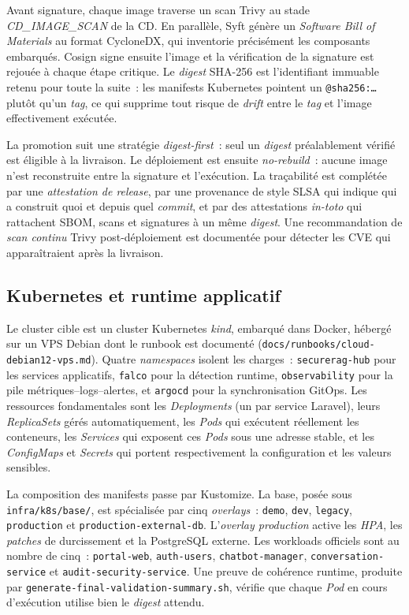 Avant signature, chaque image traverse un scan Trivy au stade
\emph{CD\_IMAGE\_SCAN} de la CD. En parallèle, Syft génère un
\emph{Software Bill of Materials} au format CycloneDX, qui inventorie
précisément les composants embarqués. Cosign signe ensuite l'image et la
vérification de la signature est rejouée à chaque étape critique. Le
\emph{digest} SHA-256 est l'identifiant immuable retenu pour toute la
suite~: les manifests Kubernetes pointent un \texttt{@sha256:\dots}
plutôt qu'un \emph{tag}, ce qui supprime tout risque de \emph{drift}
entre le \emph{tag} et l'image effectivement exécutée.

La promotion suit une stratégie \emph{digest-first}~: seul un \emph{digest}
préalablement vérifié est éligible à la livraison. Le déploiement est
ensuite \emph{no-rebuild}~: aucune image n'est reconstruite entre la
signature et l'exécution. La traçabilité est complétée par une
\emph{attestation de release}, par une provenance de style SLSA qui
indique qui a construit quoi et depuis quel \emph{commit}, et par des
attestations \emph{in-toto} qui rattachent SBOM, scans et signatures à un
même \emph{digest}. Une recommandation de \emph{scan continu} Trivy
post-déploiement est documentée pour détecter les CVE qui apparaîtraient
après la livraison.

\subsection{Kubernetes et runtime applicatif}
\label{subsec:concepts-k8s}

Le cluster cible est un cluster Kubernetes \emph{kind}, embarqué dans
Docker, hébergé sur un VPS Debian dont le runbook est documenté
(\texttt{docs/runbooks/cloud-debian12-vps.md}). Quatre \emph{namespaces}
isolent les charges~: \texttt{securerag-hub} pour les services
applicatifs, \texttt{falco} pour la détection runtime,
\texttt{observability} pour la pile métriques--logs--alertes, et
\texttt{argocd} pour la synchronisation GitOps. Les ressources
fondamentales sont les \emph{Deployments} (un par service Laravel),
leurs \emph{ReplicaSets} gérés automatiquement, les \emph{Pods} qui
exécutent réellement les conteneurs, les \emph{Services} qui exposent
ces \emph{Pods} sous une adresse stable, et les \emph{ConfigMaps} et
\emph{Secrets} qui portent respectivement la configuration et les
valeurs sensibles.

La composition des manifests passe par Kustomize. La base, posée sous
\texttt{infra/k8s/base/}, est spécialisée par cinq \emph{overlays}~:
\texttt{demo}, \texttt{dev}, \texttt{legacy}, \texttt{production} et
\texttt{production-external-db}. L'\emph{overlay production} active les
\emph{HPA}, les \emph{patches} de durcissement et la PostgreSQL externe.
Les workloads officiels sont au nombre de cinq~: \texttt{portal-web},
\texttt{auth-users}, \texttt{chatbot-manager},
\texttt{conversation-service} et \texttt{audit-security-service}. Une
preuve de cohérence runtime, produite par
\texttt{generate-final-validation-summary.sh}, vérifie que chaque
\emph{Pod} en cours d'exécution utilise bien le \emph{digest} attendu.

